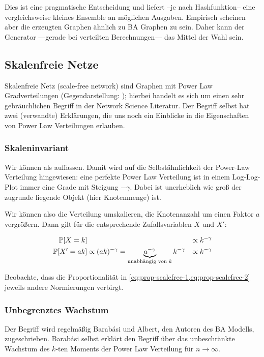 Dies ist eine pragmatische Entscheidung und liefert --je nach Hashfunktion-- eine vergleichsweise kleines Ensemble an möglichen Ausgaben.
Empirisch scheinen aber die erzeugten Graphen ähnlich zu BA Graphen zu sein.
Daher kann der Generator ---gerade bei verteilten Berechnungen--- das Mittel der Wahl sein.

\subsection{Skalenfreie Netze}
Skalenfreie Netz (scale-free network) sind Graphen mit Power Law Gradverteilungen (Gegendarstellung: \cite{doi:10.1073/pnas.200327197});
hierbei handelt es sich um einen sehr gebräuchlichen Begriff in der Network Science Literatur.
Der Begriff selbst hat zwei (verwandte) Erklärungen, die uns noch ein Einblicke in die Eigenschaften von Power Law Verteilungen erlauben.

\subsubsection{Skaleninvariant}\label{subsec:scaleinvariant}
Wir können  als  auffassen.
Damit wird auf die Selbstähnlichkeit der Power-Law Verteilung hingewiesen:
eine perfekte Power Law Verteilung ist in einem Log-Log-Plot immer eine Grade mit Steigung $-\gamma$.
Dabei ist unerheblich wie groß der zugrunde liegende Objekt (hier Knotenmenge) ist.

Wir können also die Verteilung umskalieren, \zB die Knotenanzahl um einen Faktor $a$ vergrößern.
Dann gilt für die entsprechende Zufallsvariablen $X$ und $X'$:

\begin{align}
    \mathbb{P}\!\left[X = k\right]   &                                                                                           & \propto k^{-\gamma}  \label{eq:prop-scalefree-1} \\
    \mathbb{P}\!\left[X' = ak\right] & \propto (ak)^{-\gamma} = \underbrace{a^{-\gamma}}_{\text{unabhängig von $k$}} k^{-\gamma} & \propto k^{-\gamma}\label{eq:prop-scalefree-2}
\end{align}

Beobachte, dass die Proportionalität in \cref{eq:prop-scalefree-1,eq:prop-scalefree-2} jeweils andere Normierungen verbirgt.

\subsubsection{Unbegrenztes Wachstum}
Der Begriff  wird regelmäßig Barab{\'{a}}si und Albert, den Autoren des BA Modells, zugeschrieben.
Barab{\'{a}}si selbst erklärt den Begriff über das unbeschränkte Wachstum des $k$-ten Moments der Power Law Verteilung für $n \to \infty$.

